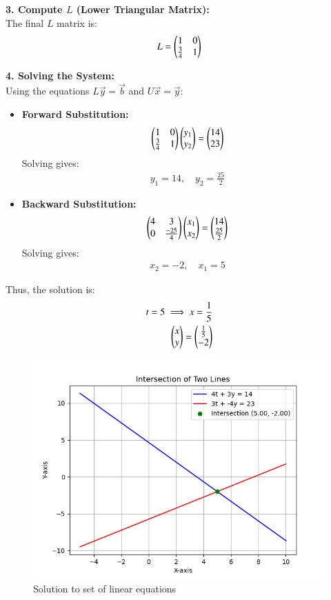 \documentclass[journal]{IEEEtran}
\begin{document}
\textbf{3. Compute $L$ (Lower Triangular Matrix):}\\
The final $L$ matrix is:
\begin{align}
    L = \begin{pmatrix}1 & 0 \\ \frac{3}{4} & 1\end{pmatrix}
\end{align}

\textbf{4. Solving the System:}\\
Using the equations $L\vec{y} = \vec{b}$ and $U\vec{x} = \vec{y}$:
\begin{itemize}
    \item \textbf{Forward Substitution:}
    \begin{align}
        \begin{pmatrix}1 & 0 \\ \frac{3}{4} & 1\end{pmatrix}\begin{pmatrix}y_1 \\ y_2\end{pmatrix} = \begin{pmatrix}14 \\ 23\end{pmatrix}
    \end{align}
    Solving gives:
    \begin{align}
        y_1 = 14, \quad y_2 = \frac{25}{2}
    \end{align}

    \item \textbf{Backward Substitution:}
    \begin{align}
        \begin{pmatrix}4 & 3 \\ 0 & \frac{-25}{4}\end{pmatrix}\begin{pmatrix}x_1 \\ x_2\end{pmatrix} = \begin{pmatrix}14 \\ \frac{25}{2}\end{pmatrix}
    \end{align}
    Solving gives:
    \begin{align}
        x_2 = -2, \quad x_1 = 5
    \end{align}
\end{itemize}

Thus, the solution is:
\begin{align} 
    t=5 \implies x=\frac{1}{5} \\
    \begin{pmatrix}x \\ y\end{pmatrix} = \begin{pmatrix}\frac{1}{5} \\ -2 \end{pmatrix}
\end{align}

\begin{figure}[h!]
   \centering
   \includegraphics[width=0.7\columnwidth]{figs/fig.png}
    \caption{Solution to set of linear equations}
\end{figure}
\end{document}
